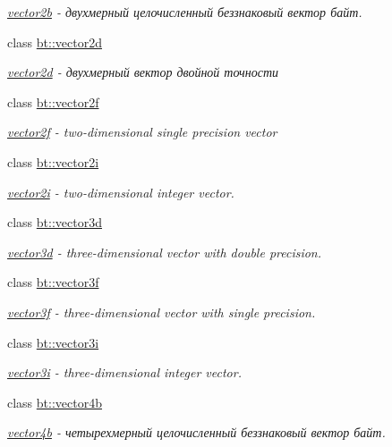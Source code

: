 \begin{DoxyCompactItemize}
\begin{DoxyCompactList}\small\item\em \hyperlink{classbt_1_1vector2b}{vector2b} -\/ двухмерный целочисленный беззнаковый вектор байт. \end{DoxyCompactList}\item 
class \hyperlink{classbt_1_1vector2d}{bt\-::vector2d}
\begin{DoxyCompactList}\small\item\em \hyperlink{classbt_1_1vector2d}{vector2d} -\/ двухмерный вектор двойной точности \end{DoxyCompactList}\item 
class \hyperlink{classbt_1_1vector2f}{bt\-::vector2f}
\begin{DoxyCompactList}\small\item\em \hyperlink{classbt_1_1vector2f}{vector2f} -\/ two-\/dimensional single precision vector \end{DoxyCompactList}\item 
class \hyperlink{classbt_1_1vector2i}{bt\-::vector2i}
\begin{DoxyCompactList}\small\item\em \hyperlink{classbt_1_1vector2i}{vector2i} -\/ two-\/dimensional integer vector. \end{DoxyCompactList}\item 
class \hyperlink{classbt_1_1vector3d}{bt\-::vector3d}
\begin{DoxyCompactList}\small\item\em \hyperlink{classbt_1_1vector3d}{vector3d} -\/ three-\/dimensional vector with double precision. \end{DoxyCompactList}\item 
class \hyperlink{classbt_1_1vector3f}{bt\-::vector3f}
\begin{DoxyCompactList}\small\item\em \hyperlink{classbt_1_1vector3f}{vector3f} -\/ three-\/dimensional vector with single precision. \end{DoxyCompactList}\item 
class \hyperlink{classbt_1_1vector3i}{bt\-::vector3i}
\begin{DoxyCompactList}\small\item\em \hyperlink{classbt_1_1vector3i}{vector3i} -\/ three-\/dimensional integer vector. \end{DoxyCompactList}\item 
class \hyperlink{classbt_1_1vector4b}{bt\-::vector4b}
\begin{DoxyCompactList}\small\item\em \hyperlink{classbt_1_1vector4b}{vector4b} -\/ четырехмерный целочисленный беззнаковый вектор байт. \end{DoxyCompactList}\item 

\end{DoxyCompactItemize}
